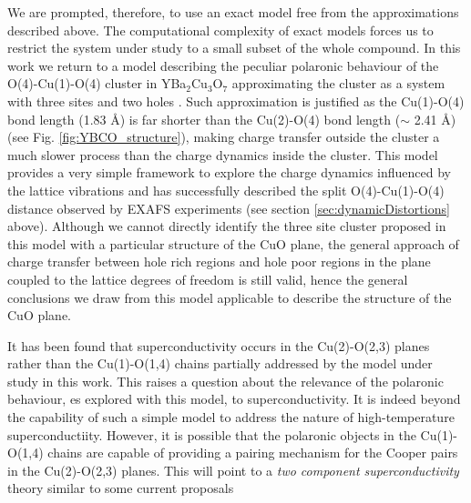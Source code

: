 We are prompted, therefore, to use an exact model free from the approximations described above. 
The computational complexity of exact models forces us to restrict the system under study to a small subset of the whole compound.
In this work we return to a model describing the peculiar polaronic behaviour of the O(4)-Cu(1)-O(4) cluster in YBa$_{2}$Cu$_{3}$O$_{7}$ approximating the cluster as a system with three sites and two holes \cite{MustredeLeon1992}.
Such approximation is justified as the Cu(1)-O(4) bond length (1.83 \AA) is far shorter than the Cu(2)-O(4) bond length ($\sim$ 2.41 \AA) (see Fig. \ref{fig:YBCO_structure}), making charge transfer outside the cluster a much slower process than the charge dynamics inside the cluster. 
This model provides a very simple framework to explore the charge dynamics influenced by the lattice vibrations and has successfully described the split O(4)-Cu(1)-O(4) distance observed by EXAFS experiments (see section \ref{sec:dynamicDistortions} above).
Although we cannot directly identify the three site cluster proposed in this model with a particular structure of the CuO plane, the general approach of charge transfer between hole rich regions and hole poor regions in the plane coupled to the lattice degrees of freedom is still valid, hence the general conclusions we draw from this model applicable to describe the structure of the CuO plane.

It has been found that superconductivity occurs in the Cu(2)-O(2,3) planes rather than the Cu(1)-O(1,4) chains partially addressed by the model under study in this work.
This raises a question about the relevance of the polaronic behaviour, es explored with this model, to superconductivity.
It is indeed beyond the capability of such a simple model to address the nature of high-temperature superconductiity.
However, it is possible that the polaronic objects in the Cu(1)-O(1,4) chains are capable of providing a pairing mechanism for the Cooper pairs in the Cu(2)-O(2,3) planes.
This will point to a \textit{two component superconductivity} theory similar to some current proposals \cite{?}

